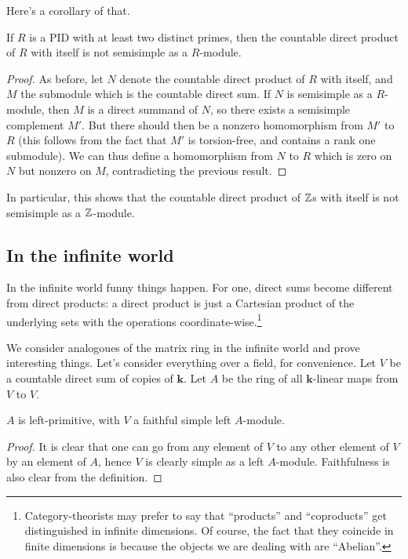 \documentclass[a4paper]{amsart}
\newcommand{\field}{\mathbf{k}}
\begin{document}
Here's a corollary of that.

\begin{theorem}
  If $R$ is a PID with at least two distinct primes, then the
  countable direct product of $R$ with itself is not semisimple as a
  $R$-module.
\end{theorem}

\begin{proof}
  As before, let $N$ denote the countable direct product of $R$ with
  itself, and $M$ the submodule which is the countable direct sum. If
  $N$ is semisimple as a $R$-module, then $M$ is a direct summand of
  $N$, so there exists a semisimple complement $M'$. But there should
  then be a nonzero homomorphism from $M'$ to $R$ (this follows from
  the fact that $M'$ is torsion-free, and contains a rank one
  submodule). We can thus define a homomorphism from $N$ to $R$
  which is zero on $N$ but nonzero on $M$, contradicting the previous result.
\end{proof}

In particular, this shows that the countable direct product of $\mathbb{Z}$s
with itself is not semisimple as a $\mathbb{Z}$-module.
\subsection{In the infinite world}

In the infinite world funny things happen. For one, direct sums become
different from direct products: a direct product is just a Cartesian
product of the underlying sets with the operations
coordinate-wise.\footnote{Category-theorists may prefer to say that
  ``products'' and ``coproducts'' get distinguished in infinite
  dimensions. Of course, the fact that they coincide in finite
  dimensions is because the objects we are dealing with are
  ``Abelian''.}

We consider analogoues of the matrix ring in the infinite world and
prove interesting things. Let's consider everything over a field, for
convenience. Let $V$ be a countable direct sum of copies of
$\field$. Let $A$ be the ring of all $\field$-linear maps from $V$ to
$V$.

\begin{claimer}
  $A$ is left-primitive, with $V$ a faithful simple left $A$-module.
\end{claimer}

\begin{proof}
  It is clear that one can go from any element of $V$ to any other
  element of $V$ by an element of $A$, hence $V$ is clearly simple as
  a left $A$-module.  Faithfulness is also clear from the definition.
\end{proof}
\end{document}
